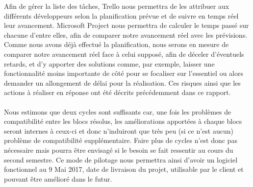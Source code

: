 Afin de gérer la liste des tâches, Trello nous permettra de les attribuer aux différents développeurs selon la planification prévue et de suivre en temps réel leur avancement. Microsoft Project nous permettra de calculer le temps passé sur chacune d’entre elles, afin de comparer notre avancement réel avec les prévisions. Comme nous avons déjà effectué la planification, nous serons en mesure de comparer notre avancement réel face à celui supposé, afin de déceler d’éventuels retards, et d’y apporter des solutions comme, par exemple, laisser une fonctionnalité moins importante de côté pour se focaliser sur l’essentiel ou alors demander un allongement de délai pour la réalisation. Ces risques ainsi que les actions à réaliser en réponse ont été décrits précédemment dans ce rapport.

\paragraph{}

Nous estimons que deux cycles sont suffisants car, une fois les problèmes de compatibilité entre les blocs résolus, les améliorations apportées à chaque blocs seront internes à ceux-ci et donc n’induiront que très peu (si ce n’est aucun) problème de compatibilité supplémentaire. Faire plus de cycles n’est donc pas nécessaire mais pourra être envisagé si le besoin se fait ressentir au cours du second semestre. Ce mode de pilotage nous permettra ainsi d’avoir un logiciel fonctionnel au 9 Mai 2017, date de livraison du projet, utilisable par le client et pouvant être amélioré dans le futur.















